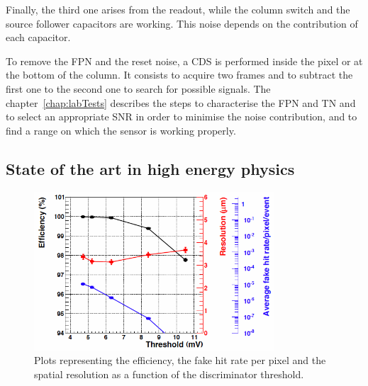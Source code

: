     Finally, the third one arises from the readout, while the column switch and the source follower capacitors are working.
    This noise depends on the contribution of each capacitor.
    
    To remove the \gls{FPN} and the reset noise, a \gls{CDS} is performed inside the pixel or at the bottom of the column.
    It consists to acquire two frames and to subtract the first one to the second one to search for possible signals.
    The chapter~\ref{chap:labTests} describes the steps to characterise the \gls{FPN} and \gls{TN} and to select an appropriate \gls{SNR} in order to minimise the noise contribution, and to find a range on which the sensor is working properly.


    \subsection{State of the art in high energy physics}
    \label{subsec:Mi26}

    \begin{figure}
      \centering
      \includegraphics[width=0.8\textwidth]{Pictures/vxd/MIMOSA26_chip26_HR15_20deg}
      \caption{Plots representing the efficiency, the fake hit rate per pixel and the spatial resolution as a function of the discriminator threshold.}
      \label{fig:mi26Perf}
    \end{figure}

